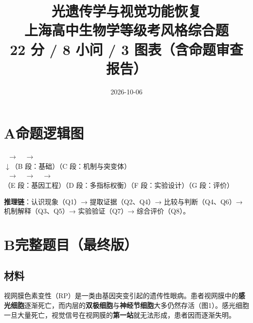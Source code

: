 \documentclass[UTF8,a4paper,11pt]{ctexart}
\title{\bfseries 光遗传学与视觉功能恢复\\[5pt]\large 上海高中生物学等级考风格综合题\\[4pt]
\normalsize 22 分 / 8 小问 / 3 图表（含命题审查报告）}
\author{}\date{2026-10-06}
\begin{document}
\maketitle
\thispagestyle{fancy}

\begin{center}
\end{center}

\section*{A\quad 命题逻辑图}

\begin{center}
\small
{}\ $\rightarrow$\ \ $\rightarrow$\ \\[4pt]
$\downarrow$\hfill（B 段：基础）\hfill（C 段：机制与突变体）\hfill\\[2pt]
\ $\rightarrow$\ \ $\rightarrow$\ \ $\rightarrow$\ \\[4pt]
（E 段：基因工程）\hfill（D 段：多指标权衡）\hfill（F 段：实验设计）\hfill（G 段：评价）
\end{center}

\noindent\textbf{推理链}：认识现象（Q1）→ 提取证据（Q2、Q4）→ 比较与判断（Q4、Q6）→ 机制解释（Q3、Q5）→ 实验验证（Q7）→ 综合评价（Q8）。

\section{B\quad 完整题目（最终版）}

\subsection*{材料}

视网膜色素变性（RP）是一类由基因突变引起的遗传性眼病。患者视网膜中的\textbf{感光细胞}逐渐死亡，而内层的\textbf{双极细胞}与\textbf{神经节细胞}大多仍然存活（图1）。感光细胞一旦大量死亡，视觉信号在视网膜的\textbf{第一站}就无法形成，患者因而逐渐失明。
\end{document}
